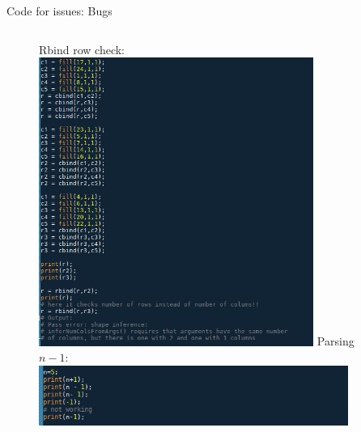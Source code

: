 \documentclass[aspectratio=169]{beamer}
\begin{document}
\begin{frame}[c]{Code for issues: Bugs}
    \begin{figure}
        \begin{columns}[onlytextwidth,t]
            Rbind row check: \\
            \includegraphics[width=0.8\textwidth]{images/I1.png}
            Parsing $n-1$: \\
            \includegraphics[width=0.9\textwidth]{images/I2.png}
        \end{columns}        
    \end{figure}          
\end{frame}
\end{document}
